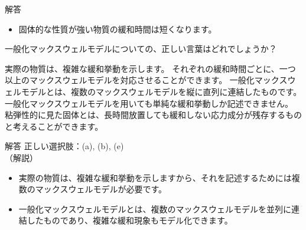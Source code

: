 \documentclass[uplatex,dvipdfmx,a4paper,11pt]{jsarticle}
\begin{document}
\begin{qlist}
\begin{itembox}[l]{解答}
\begin{itemize}
				\item 固体的な性質が強い物質の緩和時間は短くなります。
			\end{itemize}
        \end{itembox}
	\qitem 一般化マックスウェルモデルについての、正しい言葉はどれでしょうか？
		\begin{qlist2}
			\qitem 実際の物質は、複雑な緩和挙動を示します。
			\qitem それぞれの緩和時間ごとに、一つ以上のマックスウェルモデルを対応させることができます。
			\qitem 一般化マックスウェルモデルとは、複数のマックスウェルモデルを縦に直列に連結したものです。
			\qitem 一般化マックスウェルモデルを用いても単純な緩和挙動しか記述できません。
			\qitem 粘弾性的に見た固体とは、長時間放置しても緩和しない応力成分が残存するものと考えることができます。
		\end{qlist2}
		\vspace{3mm}
        \begin{itembox}[l]{解答}
            正しい選択肢：(a), (b), (e)\\
            （解説）
			\begin{itemize}
				\item 実際の物質は、複雑な緩和挙動を示しますから、それを記述するためには複数のマックスウェルモデルが必要です。
				\item 一般化マックスウェルモデルとは、複数のマックスウェルモデルを並列に連結したものであり、複雑な緩和現象もモデル化できます。
			\end{itemize}
        \end{itembox}
\end{qlist}
\end{document}
